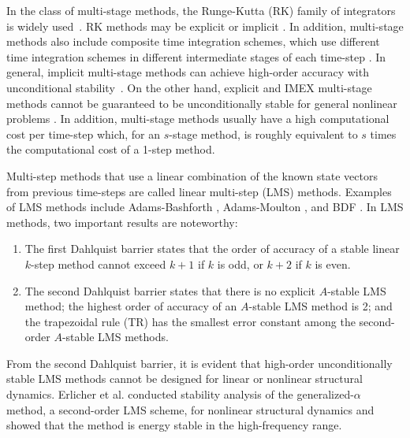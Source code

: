 \documentclass[review]{elsarticle}
\begin{document}
In the class of multi-stage methods, the Runge-Kutta (RK) family of integrators is widely used~\cite{wang2023overview,butcher1996history,butcher2000numerical,butcher2016numerical}. 
RK methods may be explicit \cite{runge1895numerische,heun1900neue,kutta1901beitrag,nystrom1925numerische,butcher1964runge} or implicit \cite{kuntzmann1961neuere,butcher1964implicit,alexander1977diagonally,kennedy2016diagonally,ababneh2009design}.
In addition, multi-stage methods also include composite time integration schemes, which use different time integration schemes in different intermediate stages of each time-step \cite{bathe2005composite,bathe2007conserving,noh2013explicit,soares2016novel,kwon2017non,kim2017new,kim2018improved,kim2018improved2,malakiyeh2019bathe,malakiyeh2021new,noh2019bathe,kwon2020analysis,kwon2021selecting,kim2019higher,ji2020optimized}.
In general, implicit multi-stage methods can achieve high-order accuracy with unconditional stability~\cite{iserles2009first,wanner1996solving}.
On the other hand, explicit and IMEX multi-stage methods cannot be guaranteed to be unconditionally stable for general nonlinear problems \cite{verwer1996explicit, tan2022stability}.
In addition, multi-stage methods usually have a high computational cost per time-step which, for an $s$-stage method, is roughly equivalent to $s$ times the computational cost of a 1-step method.

Multi-step methods that use a linear combination of the known state vectors from previous time-steps are called linear multi-step (LMS) methods.
Examples of LMS methods include Adams-Bashforth \cite{bashforth1883attempt}, Adams-Moulton \cite{moulton1926new}, and BDF \cite{gear1971numerical}.
In LMS methods, two important results are noteworthy:
\begin{enumerate}
    \item[(1)] The first Dahlquist barrier \cite{dahlquist1956convergence,dahlquist1958stability} states that the order of accuracy of a stable linear $k$-step method cannot exceed $k+1$ if $k$ is odd, or $k+2$ if $k$ is even.
    \item[(2)] The second Dahlquist barrier \cite{dahlquist1963special} states that there is no explicit $A$-stable LMS method; the highest order of accuracy of an $A$-stable LMS method is 2; and the trapezoidal rule (TR) has the smallest error constant among the second-order $A$-stable LMS methods.
\end{enumerate}
From the second Dahlquist barrier, it is evident that high-order unconditionally stable LMS methods cannot be designed for linear or nonlinear structural dynamics.
Erlicher et al. \cite{erlicher2002analysis} conducted stability analysis of the generalized-$\alpha$ method, a second-order LMS scheme, for nonlinear structural dynamics and showed that the method is energy stable in the high-frequency range.
\end{document}
